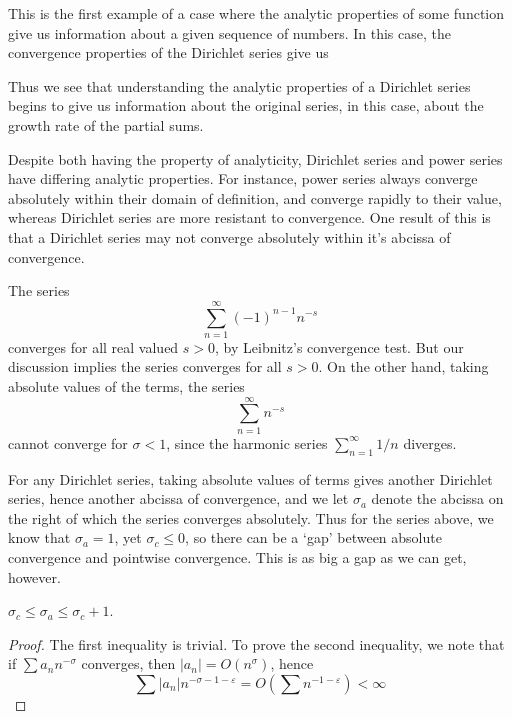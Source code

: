 \begin{remark}
    This is the first example of a case where the analytic properties of some function give us information about a given sequence of numbers. In this case, the convergence properties of the Dirichlet series give us

    Thus we see that understanding the analytic properties of a Dirichlet series begins to give us information about the original series, in this case, about the growth rate of the partial sums.
\end{remark}

Despite both having the property of analyticity, Dirichlet series and power series have differing analytic properties. For instance, power series always converge absolutely within their domain of definition, and converge rapidly to their value, whereas Dirichlet series are more resistant to convergence. One result of this is that a Dirichlet series may not converge absolutely within it's abcissa of convergence.

\begin{example}
The series
%
\[ \sum_{n = 1}^\infty (-1)^{n-1} n^{-s} \]
%
converges for all real valued $s > 0$, by Leibnitz's convergence test. But our discussion implies the series converges for all $s > 0$. On the other hand, taking absolute values of the terms, the series
%
\[ \sum_{n = 1}^\infty n^{-s} \]
%
cannot converge for $\sigma < 1$, since the harmonic series $\sum_{n = 1}^\infty 1/n$ diverges.
\end{example}

For any Dirichlet series, taking absolute values of terms gives another Dirichlet series, hence another abcissa of convergence, and we let $\sigma_a$ denote the abcissa on the right of which the series converges absolutely. Thus for the series above, we know that $\sigma_a = 1$, yet $\sigma_c \leq 0$, so there can be a `gap' between absolute convergence and pointwise convergence. This is as big a gap as we can get, however.

\begin{theorem}
    $\sigma_c \leq \sigma_a \leq \sigma_c + 1$.
\end{theorem}
\begin{proof}
    The first inequality is trivial. To prove the second inequality, we note that if $\sum a_n n^{-\sigma}$ converges, then $|a_n| = O(n^\sigma)$, hence
    \[ \sum |a_n| n^{-\sigma-1-\varepsilon} = O \left(\sum n^{-1-\varepsilon} \right) < \infty \]
\end{proof}

